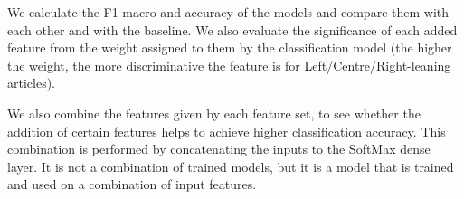 We calculate the F1-macro and accuracy of the models and compare them with each other and with the baseline. %
We also evaluate the significance of each added feature from the weight assigned to them %
by the classification model (the higher the weight, the more discriminative the feature is for Left/Centre/Right-leaning articles). %

We also combine the features given by each feature set, to see whether the addition of certain features helps to achieve higher classification accuracy. %
This combination is performed by concatenating the inputs to the SoftMax dense layer. It is not a combination of trained models, but it is a model that is trained and used on a combination of input features.


